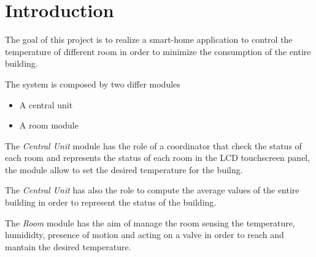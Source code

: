 \section{Introduction}
The goal of this project is to realize a smart-home application to control the temperature of different room in order to minimize the consumption of the entire building.

The system is composed by two differ modules
\begin{itemize}
	\item A central unit
	\item A room module
\end{itemize}

The \textit{Central Unit} module has the role of a coordinator that check the status of each room and represents the status 
of each room in the LCD touchscreen panel, the module allow to set the desired temperature for the builng.

The \textit{Central Unit} has also the role to compute the average values of the entire building 
in order to represent the status of the building.

The \textit{Room} module has the aim of manage the room sensing the temperature, humididty, presence of motion and acting on a valve 
in order to reach and mantain the desired temperature.